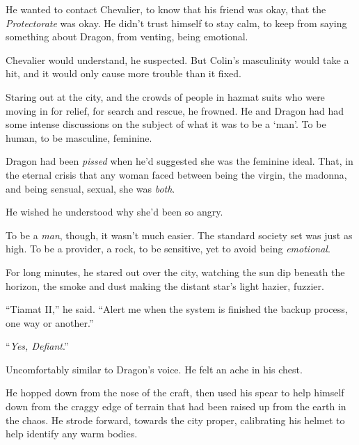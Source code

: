He wanted to contact Chevalier, to know that his friend was okay, that the \emph{Protectorate} was okay.  He didn't trust himself to stay calm, to keep from saying something about Dragon, from venting, being emotional.



Chevalier would understand, he suspected.  But Colin's masculinity would take a hit, and it would only cause more trouble than it fixed.



Staring out at the city, and the crowds of people in hazmat suits who were moving in for relief, for search and rescue, he frowned.  He and Dragon had had some intense discussions on the subject of what it was to be a `man'.  To be human, to be masculine, feminine.



Dragon had been \emph{pissed} when he'd suggested she was the feminine ideal.  That, in the eternal crisis that any woman faced between being the virgin, the madonna, and being sensual, sexual, she was \emph{both}.



He wished he understood why she'd been so angry.



To be a \emph{man}, though, it wasn't much easier.  The standard society set was just as high.  To be a provider, a rock, to be sensitive, yet to avoid being \emph{emotional}.



For long minutes, he stared out over the city, watching the sun dip beneath the horizon, the smoke and dust making the distant star's light hazier, fuzzier.



``Tiamat II,'' he said.  ``Alert me when the system is finished the backup process, one way or another.''



``\emph{Yes, Defiant}.''



Uncomfortably similar to Dragon's voice.  He felt an ache in his chest.



He hopped down from the nose of the craft, then used his spear to help himself down from the craggy edge of terrain that had been raised up from the earth in the chaos.  He strode forward, towards the city proper, calibrating his helmet to help identify any warm bodies.



